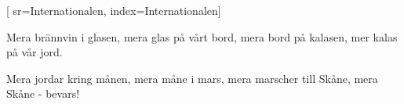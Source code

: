 [ 						
	sr={Internationalen},					
	index={Internationalen}]		
	
\beginverse*						
Mera brännvin i glasen,
mera glas på vårt bord,
mera bord på kalasen,
mer kalas på vår jord.
\endverse						

\beginverse				
Mera jordar kring månen,
mera måne i mars,
mera marscher till Skåne,
mera Skåne - bevars!
\endverse			

\vspace{1cm}	
\endsong		

